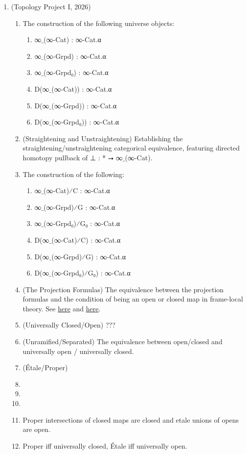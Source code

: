 \documentclass{book}
\begin{document}
\begin{enumerate}
\item (Topology Project I, 2026)
\begin{enumerate}
\item The construction of the following universe objects:
\begin{enumerate}
\item ∞${}\_$(∞-Cat) : ∞-Cat.α
\item ∞${}\_$(∞-Grpd) : ∞-Cat.α
\item ∞${}\_$(∞-Grpd₀) : ∞-Cat.α
\item D(∞${}\_$(∞-Cat)) : ∞-Cat.α
\item D(∞${}\_$(∞-Grpd)) : ∞-Cat.α
\item D(∞${}\_$(∞-Grpd₀)) : ∞-Cat.α
\end{enumerate}
\item (Straightening and Unstraightening) Establishing the straightening/unstraightening categorical equivalence, featuring directed homotopy pullback of ⊥ : * ⭢ ∞${}\_$(∞-Cat).
\item The construction of the following:
\begin{enumerate}
\item ∞${}\_$(∞-Cat)⁄C : ∞-Cat.α
\item ∞${}\_$(∞-Grpd)⁄G : ∞-Cat.α
\item ∞${}\_$(∞-Grpd₀)⁄G₀ : ∞-Cat.α
\item D(∞${}\_$(∞-Cat)⁄C) : ∞-Cat.α
\item D(∞${}\_$(∞-Grpd)⁄G) : ∞-Cat.α
\item D(∞${}\_$(∞-Grpd₀)⁄G₀) : ∞-Cat.α
\end{enumerate}
\item (The Projection Formulas) The equivalence between the projection formulas and the condition of being an open or closed map in frame-local theory. See \href{https://ncatlab.org/nlab/show/closed+morphism}{here} and \href{https://ncatlab.org/nlab/show/open+morphism}{here}.
\item (Universally Closed/Open) ???
\item (Unramified/Separated) The equivalence between open/closed and universally open / universally closed.
\item (Étale/Proper) 
\item 
\item 
\item 
\item Proper intersections of closed maps are closed and etale unions of opens are open.
\item Proper iff universally closed, Étale iff universally open.

\end{enumerate}
\end{enumerate}
\end{document}
